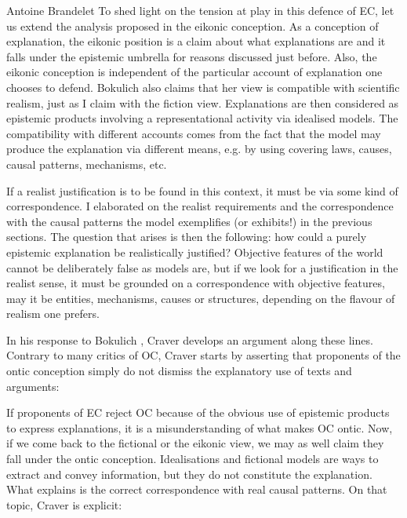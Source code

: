 \begin{artengenv}{Antoine Brandelet}
To shed light on the tension at play in this defence of EC, let us extend the analysis proposed in the eikonic conception. As a conception of explanation, the eikonic position is a claim about what explanations are and it falls under the epistemic umbrella for reasons discussed just before. Also, the eikonic conception is independent of the particular account of explanation one chooses to defend. Bokulich also claims that her view is compatible with scientific realism, just as I claim with the fiction view. Explanations are then considered as epistemic products involving a representational activity via idealised models. The compatibility with different accounts comes from the fact that the model may produce the explanation via different means, e.g. by using covering laws, causes, causal patterns, mechanisms, etc.

If a realist justification is to be found in this context, it must be via some kind of correspondence. I elaborated on the realist requirements and the correspondence with the causal patterns the model exemplifies (or exhibits!) in the previous sections. The question that arises is then the following: how could a purely epistemic explanation be realistically justified? Objective features of the world cannot be deliberately false as models are, but if we look for a justification in the realist sense, it must be grounded on a correspondence with objective features, may it be entities, mechanisms, causes or structures, depending on the flavour of realism one prefers.

In his response to Bokulich \parencite*{Bokulich2016}, Craver develops an argument along these lines. Contrary to many critics of OC, Craver starts by asserting that proponents of the ontic conception simply do not dismiss the explanatory use of texts and arguments:


If proponents of EC reject OC because of the obvious use of epistemic products to express explanations, it is a misunderstanding of what makes OC ontic. Now, if we come back to the fictional or the eikonic view, we may as well claim they fall under the ontic conception. Idealisations and fictional models are ways to extract and convey information, but they do not constitute the explanation. What explains is the correct correspondence with real causal patterns. On that topic, Craver is explicit:


\end{artengenv}
